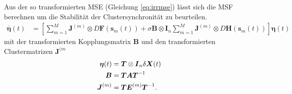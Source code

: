 Aus der so transformierten MSE (Gleichung \ref{eq:irrmse}) lässt sich die MSF berechnen um die Stabilität der Clustersynchronität zu beurteilen.
\begin{align}
	\label{eq:irrmse}
		\overset{\cdot}{\boldsymbol{\eta}}(t)&=
				\left[\sum_{m=1}^{M} \boldsymbol{J}^{(m)} \otimes D\boldsymbol{F}(\boldsymbol{s}_m(t))+\sigma\boldsymbol{B}\otimes \boldsymbol{I}_n\sum_{m=1}^{M} \boldsymbol{J}^{(m)}\otimes D\boldsymbol{H}(\boldsymbol{s}_m(t))\right]\boldsymbol{\eta}(t)
		\end{align}
		mit der transformierten Kopplungsmatrix $\boldsymbol{B}$ und den transformierten Clustermatrizen $\boldsymbol{J}^{(m}$
		\begin{align}
				 \boldsymbol{\eta}(t)&=\boldsymbol{T}\otimes\boldsymbol{I}_n\delta\boldsymbol{X}(t)
				\\\notag \boldsymbol{B}&=\boldsymbol{T}\boldsymbol{A}\boldsymbol{T}^{-1}
				\\\notag \boldsymbol{J}^{(m)}&=\boldsymbol{T}\boldsymbol{E}^{(m)}\boldsymbol{T}^{-1}.
		\end{align}
		




